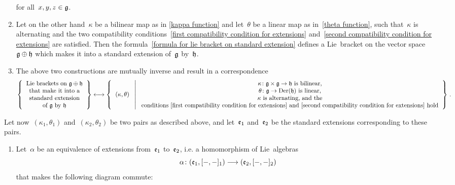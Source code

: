 \begin{theorem}
\begin{enumerate}
			for all~$x, y, z \in \mathfrak{g}$.
		\item
			Let on the other hand~$\kappa$ be a bilinear map as in \eqref{kappa function} and let~$\theta$ be a linear map as in~\eqref{theta function}, such that~$\kappa$ is alternating and the two compatibility conditions~\eqref{first compatibility condition for extensions} and~\eqref{second compatibility condition for extensions} are satisfied.
			Then the formula~\eqref{formula for lie bracket on standard extension} defines a Lie~bracket on the vector space~$\mathfrak{g} \oplus \mathfrak{h}$ which makes it into a standard extension of~$\mathfrak{g}$ by~$\mathfrak{h}$.
		\item
			The above two constructions are mutually inverse and result in a {\onetoonetext} correspondence
			\[
				\left\{
					\begin{tabular}{c}
						Lie~brackets on~$\glie \oplus \hlie$ \\
						that make it into a \\
						standard extension \\
						of~$\glie$ by~$\hlie$
					\end{tabular}
				\right\}
				\onetoone
				\left\{
					\begin{tabular}{c}
						$(\kappa, \theta)$
					\end{tabular}
				\suchthat*
					\begin{tabular}{c}
						$\kappa \colon \glie \times \glie \to \hlie$ is bilinear, \\
						$\theta \colon \glie \to \Der(\hlie)$ is linear, \\
						$\kappa$ is alternating, and the \\
						conditions~\eqref{first compatibility condition for extensions} and~\eqref{second compatibility condition for extensions} hold
					\end{tabular}
				\right\} \,.
			\]
	\end{enumerate}
	Let now~$(\kappa_1, \theta_1)$ and~$(\kappa_2, \theta_2)$ be two pairs as described above, and let~$\mathfrak{e}_1$ and~$\mathfrak{e}_2$ be the standard extensions corresponding to these pairs.
	\begin{enumerate}[resume*]
		\item
			Let~$\alpha$ be an equivalence of extensions from~$\mathfrak{e}_1$ to~$\mathfrak{e}_2$, i.e. a homomorphism of Lie~algebras
			\[
				\alpha
				\colon
				(\elie_1, [\ph, \ph]_1)
				\to
				(\elie_2, [\ph, \ph]_2)
			\]
			that makes the following diagram commute:
			\[
				\begin{tikzcd}

\end{tikzcd}\]
\end{enumerate}
\end{theorem}
